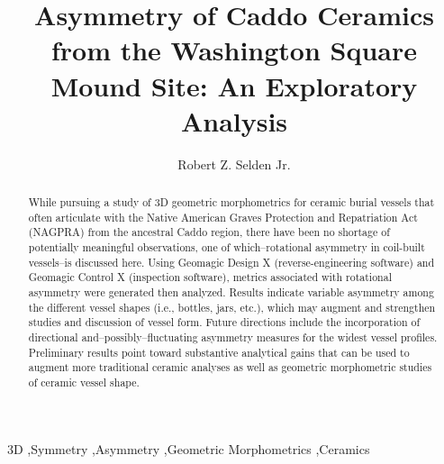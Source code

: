 \documentclass[preprint,12pt]{elsarticle}
\begin{document}
\begin{frontmatter}


\title{Asymmetry of Caddo Ceramics from the Washington Square Mound Site: An Exploratory Analysis}




\author[1]{Robert Z. Selden Jr. }

\address[1]{Center for Regional Heritage Research, Stephen F. Austin State University, Nacogdoches, USA}


\begin{abstract}
While pursuing a study of 3D geometric morphometrics for ceramic burial vessels that often articulate with the Native American Graves Protection and Repatriation Act (NAGPRA) from the ancestral Caddo region, there have been no shortage of potentially meaningful observations, one of which--rotational asymmetry in coil-built vessels--is discussed here. Using Geomagic Design X (reverse-engineering software) and Geomagic Control X (inspection software), metrics associated with rotational asymmetry were generated then analyzed. Results indicate variable asymmetry among the different vessel shapes (i.e., bottles, jars, etc.), which may augment and strengthen studies and discussion of vessel form. Future directions include the incorporation of directional and--possibly--fluctuating asymmetry measures for the widest vessel profiles. Preliminary results point toward substantive analytical gains that can be used to augment more traditional ceramic analyses as well as geometric morphometric studies of ceramic vessel shape. 
\end{abstract}

\begin{keyword}
3D \sep  Symmetry \sep Asymmetry \sep Geometric Morphometrics \sep Ceramics 


\end{keyword}

\end{frontmatter}
\end{document}

